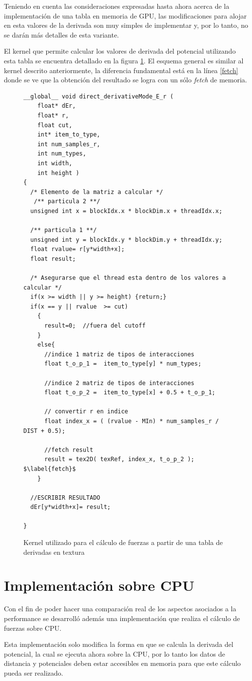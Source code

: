 Teniendo en cuenta las consideraciones expresadas hasta ahora acerca de la implementación de una tabla en memoria de GPU, las modificaciones para alojar en esta valores de la derivada son muy simples de implementar y, por lo tanto, no se darán más detalles de esta variante.

El kernel que permite calcular los valores de derivada del potencial utilizando esta tabla se encuentra detallado en la figura \ref{code:derivativesKernel}.
El esquema general es similar al kernel descrito anteriormente, la diferencia fundamental está en la línea \ref{fetch} donde se ve que la obtención del resultado se logra con un sólo \textit{fetch} de memoria.

\begin{figure}[htbp]
    \begin{lstlisting}
__global__ void direct_derivativeMode_E_r (
    float* dEr,
    float* r, 
    float cut, 
    int* item_to_type, 
    int num_samples_r, 
    int num_types, 
    int width, 
    int height )
{ 
  /* Elemento de la matriz a calcular */
   /** particula 2 **/
  unsigned int x = blockIdx.x * blockDim.x + threadIdx.x;
  
  /** particula 1 **/
  unsigned int y = blockIdx.y * blockDim.y + threadIdx.y;	
  float rvalue= r[y*width+x]; 
  float result;
  
  /* Asegurarse que el thread esta dentro de los valores a calcular */
  if(x >= width || y >= height) {return;}
  if(x == y || rvalue  >= cut) 
    {
      result=0;  //fuera del cutoff
    }
    else{
      //indice 1 matriz de tipos de interacciones
      float t_o_p_1 =  item_to_type[y] * num_types;	
      
      //indice 2 matriz de tipos de interacciones
      float t_o_p_2 =  item_to_type[x] + 0.5 + t_o_p_1;	
      
      // convertir r en indice
      float index_x = ( (rvalue - MIn) * num_samples_r / DIST + 0.5);	
     
      //fetch result
      result = tex2D( texRef, index_x, t_o_p_2 );     $\label{fetch}$
    }
   
  //ESCRIBIR RESULTADO 
  dEr[y*width+x]= result;

}
    \end{lstlisting}
    \caption{Kernel utilizado para el cálculo de fuerzas a partir de una tabla de derivadas en textura}
    \label{code:derivativesKernel}
\end{figure}



\section{Implementación sobre CPU}

Con el fin de poder hacer una comparación real de los aspectos asociados a la performance se desarrolló además una implementación que realiza el cálculo de fuerzas sobre CPU.

Esta implementación solo modifica la forma en que se calcula la derivada del potencial, la cual se ejecuta ahora sobre la CPU, por lo tanto los datos de distancia y potenciales deben
estar accesibles en memoria para que este cálculo pueda ser realizado.
